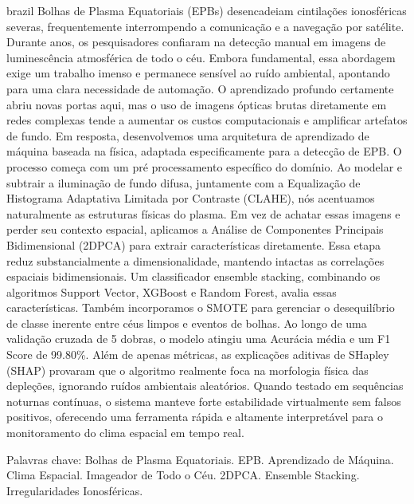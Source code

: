 \begin{resumo}[Resumo]
\begin{otherlanguage*}{brazil}
Bolhas de Plasma Equatoriais (EPBs) desencadeiam cintilações ionosféricas severas, frequentemente interrompendo a comunicação e a navegação por satélite. Durante anos, os pesquisadores confiaram na detecção manual em imagens de luminescência atmosférica de todo o céu. Embora fundamental, essa abordagem exige um trabalho imenso e permanece sensível ao ruído ambiental, apontando para uma clara necessidade de automação. O aprendizado profundo certamente abriu novas portas aqui, mas o uso de imagens ópticas brutas diretamente em redes complexas tende a aumentar os custos computacionais e amplificar artefatos de fundo. Em resposta, desenvolvemos uma arquitetura de aprendizado de máquina baseada na física, adaptada especificamente para a detecção de EPB. O processo começa com um pré processamento específico do domínio. Ao modelar e subtrair a iluminação de fundo difusa, juntamente com a Equalização de Histograma Adaptativa Limitada por Contraste (CLAHE), nós acentuamos naturalmente as estruturas físicas do plasma. Em vez de achatar essas imagens e perder seu contexto espacial, aplicamos a Análise de Componentes Principais Bidimensional (2DPCA) para extrair características diretamente. Essa etapa reduz substancialmente a dimensionalidade, mantendo intactas as correlações espaciais bidimensionais. Um classificador ensemble stacking, combinando os algoritmos Support Vector, XGBoost e Random Forest, avalia essas características. Também incorporamos o SMOTE para gerenciar o desequilíbrio de classe inerente entre céus limpos e eventos de bolhas. Ao longo de uma validação cruzada de 5 dobras, o modelo atingiu uma Acurácia média e um F1 Score de 99.80\%. Além de apenas métricas, as explicações aditivas de SHapley (SHAP) provaram que o algoritmo realmente foca na morfologia física das depleções, ignorando ruídos ambientais aleatórios. Quando testado em sequências noturnas contínuas, o sistema manteve forte estabilidade virtualmente sem falsos positivos, oferecendo uma ferramenta rápida e altamente interpretável para o monitoramento do clima espacial em tempo real.

\vspace{\onelineskip}
\noindent Palavras chave: Bolhas de Plasma Equatoriais. EPB. Aprendizado de Máquina. Clima Espacial. Imageador de Todo o Céu. 2DPCA. Ensemble Stacking. Irregularidades Ionosféricas.
\end{otherlanguage*}
\end{resumo}
